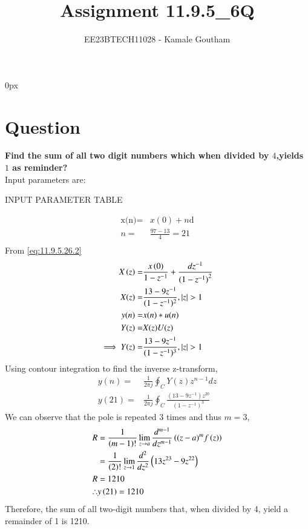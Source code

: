 \documentclass[journal,12pt,twocolumn]{IEEEtran}
\theoremstyle{remark}
\begin{document}
\parindent 0px

\title{Assignment 11.9.5\_6Q}
\author{EE23BTECH11028 - Kamale Goutham$^{}$%
}
\maketitle
\newpage
\bigskip
\section*{Question}
\textbf{Find the sum of all two digit numbers which when divided by $4$,yields $1$ as reminder?}\\
\solution 
Input parameters are:\\
\begin{table}[ht]
    \centering
    \def\arraystretch{1.5}
    
    \caption{INPUT PARAMETER TABLE}
    \label{tab:11.9.5.6}
\end{table}
  \begin{align}
    \text{x(n)}=&x(0)+n{\text{d}}\\
    n=&\frac{97-13}{4}=21\\
\end{align}
From \ref{eq:11.9.5.26.2}
\begin{align}
 X\brak z =& \frac{ x\brak 0 }{1-z^{-1}} + \frac{dz^{-1}}{{(1-z^{-1})}^{2}}  \\
X(z)=&\frac{13-9z^{-1}}{(1-z^{-1})^2},|z|>1\\
y(n)=&x(n)*u(n)\\ Y(z)=&X(z)U(z)\\\implies Y(z)=&{\frac{13-9z^{-1}}{(1-z^{-1})^{3}}},|z|>1
\end{align}
Using contour integration to find the inverse z-transform,
\begin{align}
    y(n)=&\frac{1}{2\pi j}\oint_{C}Y(z) z^{n-1} dz  \\y(21)=&\frac{1}{2\pi j}\oint_{C}{\frac{(13-9z^{-1})z^{20}}{(1-z^{-1})^{3}}}
\end{align}
We can observe that the pole is repeated $3$ times and thus $m=3$,
\begin{align}
    R&=\frac{1}{\left(m-1\right)!}\lim\limits_{z\to a}\frac{d^{m-1}}{dz^{m-1}}\left({(z-a)}^{m}f\left(z\right)\right)  \\&=\frac{1}{\left(2\right)!}\lim\limits_{z\to 1}\frac{d^{2}}{dz^{2}}\left(13z^{23}-9z^{22}\right)\\R&=1210\\
        \therefore &y\left(21\right)=1210
\end{align}
Therefore, the sum of all two-digit numbers that, when divided by 4, yield a remainder of 1 is 1210.\\
\end{document}
